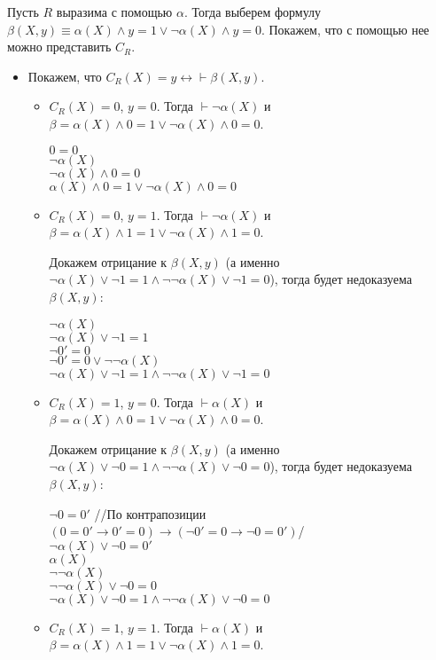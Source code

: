 \documentclass[12pt]{article}
\begin{document}
Пусть $R$ выразима с помощью $\alpha$. Тогда выберем формулу $\beta(X,y)\equiv\alpha(X)\wedge y=1\vee\neg\alpha(X)\wedge y=0$. Покажем, что с помощью нее можно представить $C_R$.
\begin{itemize}
	\item Покажем, что $C_R(X)=y\leftrightarrow\vdash\beta(X,y)$.
	\begin{itemize}
		\item $C_R(X)=0$, $y=0$. Тогда $\vdash\neg\alpha(X)$ и $\beta=\alpha(X)\wedge0=1\vee\neg\alpha(X)\wedge0=0$.
		
		$0=0$\\
		$\neg\alpha(X)$\\
		$\neg\alpha(X)\wedge 0=0$\\
		$\alpha(X)\wedge0=1\vee\neg\alpha(X)\wedge0=0$\\
		\item $C_R(X)=0$, $y=1$. Тогда $\vdash\neg\alpha(X)$ и $\beta=\alpha(X)\wedge1=1\vee\neg\alpha(X)\wedge1=0$.
		
		Докажем отрицание к $\beta(X,y)$ (а именно $\neg\alpha(X)\vee\neg1=1\wedge\neg\neg\alpha(X)\vee\neg1=0$), тогда будет недоказуема $\beta(X,y)$:
		
		$\neg\alpha(X)$\\
		$\neg\alpha(X)\vee\neg1=1$\\
		$\neg0'=0$\\
		$\neg0'=0\vee\neg\neg\alpha(X)$\\
		$\neg\alpha(X)\vee\neg1=1\wedge\neg\neg\alpha(X)\vee\neg1=0$\\
		\item $C_R(X)=1$, $y=0$. Тогда $\vdash\alpha(X)$ и $\beta=\alpha(X)\wedge0=1\vee\neg\alpha(X)\wedge0=0$.
		
		Докажем отрицание к $\beta(X,y)$ (а именно $\neg\alpha(X)\vee\neg0=1\wedge\neg\neg\alpha(X)\vee\neg0=0$), тогда будет недоказуема $\beta(X,y)$:
		
		$\neg0=0'$ //По контрапозиции $(0=0'\to0'=0)\to(\neg0'=0\to\neg0=0')$/\\
		$\neg\alpha(X)\vee\neg0=0'$\\
		$\alpha(X)$\\
		$\neg\neg\alpha(X)$\\
		$\neg\neg\alpha(X)\vee\neg0=0$\\
		$\neg\alpha(X)\vee\neg0=1\wedge\neg\neg\alpha(X)\vee\neg0=0$
		\item $C_R(X)=1$, $y=1$. Тогда $\vdash\alpha(X)$ и $\beta=\alpha(X)\wedge1=1\vee\neg\alpha(X)\wedge1=0$.
		

\end{itemize}
\end{itemize}
\end{document}
